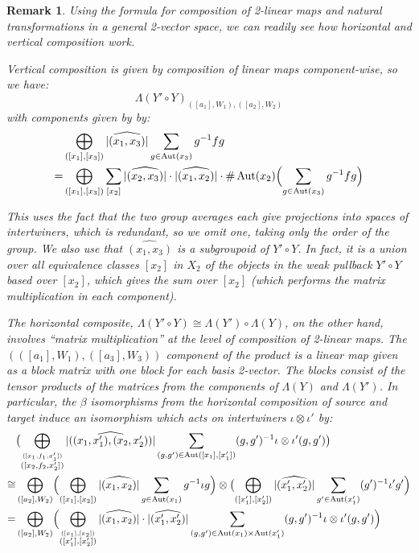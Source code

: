 \documentclass[10pt]{amsart}
\numberwithin{theorem}{subsection}
\newtheorem{varremark}[theorem]{Remark}
\newenvironment{remark}{\begin{varremark}\em}{\em\end{varremark}}
\newcommand{\opname}[1]{\operatorname{#1}}
\newcommand{\FV}{\Lambda}
\begin{document}
\begin{remark}
Using the formula for composition of 2-linear maps and natural
transformations in a general 2-vector space, we can readily see how
horizontal and vertical composition work.

Vertical composition is given by composition of linear maps
component-wise, so we have:
\begin{equation}
\FV(Y' \circ Y)_{([a_1],W_1),([a_2],W_2)}
\end{equation}
with components given by by:
\begin{align}
& \bigoplus_{([x_1],[x_3])} |\widehat{(x_1,x_3)}| \sum_{g \in \opname{Aut}(x_3)} g^{-1} f g \\
\nonumber = & \bigoplus_{([x_1],[x_3])} \sum_{[x_2]} |\widehat{(x_2,x_3)}| \cdot |\widehat{(x_1,x_2)}| \cdot \#\opname{Aut}(x_2) \Bigl{(} \sum_{g \in \opname{Aut}(x_3)} g^{-1} f g \Bigr{)}
\end{align}

This uses the fact that the two group averages each give projections
into spaces of intertwiners, which is redundant, so we omit one,
taking only the order of the group.  We also use that
$\widehat{(x_1,x_3)}$ is a subgroupoid of $Y' \circ Y$.  In fact, it
is a union over all equivalence classes $[x_2]$ in $X_2$ of the
objects in the weak pullback $Y' \circ Y$ based over $[x_2]$, which gives the sum over $[x_2]$ (which performs the matrix multiplication in each component).

The horizontal composite, $\FV(Y' \circ Y) \cong \FV(Y') \circ
\FV(Y)$, on the other hand, involves ``matrix multiplication'' at the
level of composition of 2-linear maps.  The
$(([a_1],W_1),([a_3],W_3))$ component of the product is a linear map
given as a block matrix with one block for each basis 2-vector.  The
blocks consist of the tensor products of the matrices from the
components of $\FV(Y)$ and $\FV(Y')$.  In particular, the $\beta$ isomorphisms from the horizontal composition of source and target induce an isomorphism which acts on intertwiners $\iota \otimes \iota '$ by:
\begin{align}
& \bigl{(} \bigoplus_{\stackrel{([x_1,f_1,x'_1])}{([x_2,f_2,x'_2])}} |\widehat{((x_1,x'_1),(x_2,x'_2))}| \sum_{(g,g') \in \opname{Aut}([x_1],[x'_1])} (g,g')^{-1} \iota \otimes \iota ' (g,g') \bigr{)} \\
\nonumber \cong & \bigoplus_{([a_2],W_2)} \Bigl{(} \bigoplus_{([x_1],[x_2])} |\widehat{(x_1,x_2)}| \sum_{g \in \opname{Aut}(x_1)} g^{-1} \iota g\Bigr{)} \otimes \bigl{(}\bigoplus_{([x'_1],[x'_2])} |\widehat{(x'_1,x'_2)}| \sum_{g' \in \opname{Aut}(x'_1)} (g')^{-1} \iota ' g' \Bigr{)} \\
\nonumber = & \bigoplus_{([a_2],W_2)} \Bigl{(} \bigoplus_{\stackrel{([x_1],[x_2])}{([x'_1],[x'_2])}} |\widehat{(x_1,x_2)}| \cdot |\widehat{(x'_1,x'_2)}| \sum_{(g,g') \in \opname{Aut}(x_1) \times \opname{Aut}(x'_1)} (g,g')^{-1} \iota \otimes \iota ' (g,g')\Bigr{)}
\end{align}


\end{remark}
\end{document}
